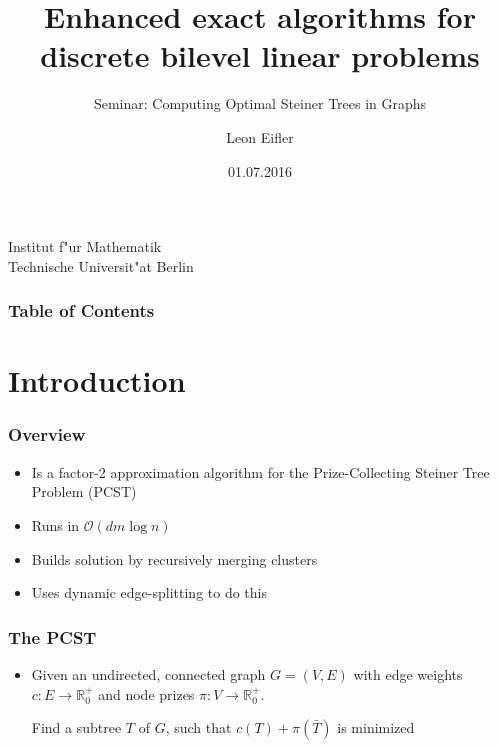 \documentclass[11pt]{beamer}
\begin{document}
	\title %
	{Enhanced exact algorithms for discrete bilevel linear problems}
	\subtitle{Seminar: Computing Optimal Steiner Trees in Graphs}
	
	\author %
	{Leon Eifler}
	
	\institute %
	{
	
		Institut f"ur Mathematik\\
		Technische Universit"at Berlin
		
	}
	
	\date %
	{01.07.2016}
	

	\begin{frame}
	\titlepage

	\end{frame}
	
\begin{frame}
	\frametitle{Table of Contents}
	\tableofcontents
\end{frame}

\section{Introduction}

\begin{frame} 
	\frametitle{Overview}
	\begin{itemize}
		\item Is a factor-2 approximation algorithm for the Prize-Collecting Steiner Tree Problem (PCST)
		\item Runs in $\mathcal O(d m \log n)$
		\item Builds solution by recursively merging clusters
		\item Uses dynamic edge-splitting to do this
	\end{itemize}
\end{frame}

\begin{frame} 
	\frametitle{The PCST}
	\begin{itemize}
		\item Given an undirected, connected graph $G=(V,E)$ with edge weights $c:E \rightarrow \mathbb{R}^+_0$ and node prizes $\pi :V \to \mathbb{R}^+_0$. 
			\begin{tcolorbox}[colback=green!5,colframe=green!40!black,title=PCST]
				Find a subtree $T$ of $G$, such that $c(T)+\pi(\bar T)$ is minimized
			\end{tcolorbox}
	\end{itemize}
\end{frame}
\end{document}

